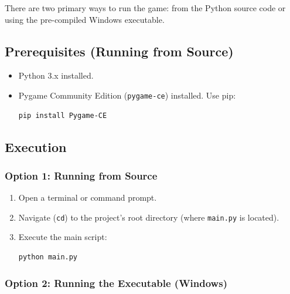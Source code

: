 \documentclass[11pt, a4paper]{article}
\begin{document}
There are two primary ways to run the game: from the Python source code or using the pre-compiled Windows executable.

\subsection{Prerequisites (Running from Source)}

\begin{itemize}

    \item Python 3.x installed.
    
    \item Pygame Community Edition (\texttt{pygame-ce}) installed. Use pip:
        \begin{lstlisting}[numbers=none, frame=single, language=bash]
pip install Pygame-CE
        \end{lstlisting}

\end{itemize}

\subsection{Execution}

\subsubsection{Option 1: Running from Source}

\begin{enumerate}

    \item Open a terminal or command prompt.
    
    \item Navigate (\texttt{cd}) to the project's root directory (where \texttt{main.py} is located).
    
    \item Execute the main script:
        \begin{lstlisting}[numbers=none, frame=single, language=bash]
python main.py
        \end{lstlisting}

\end{enumerate}

\subsubsection{Option 2: Running the Executable (Windows)}
\end{document}
